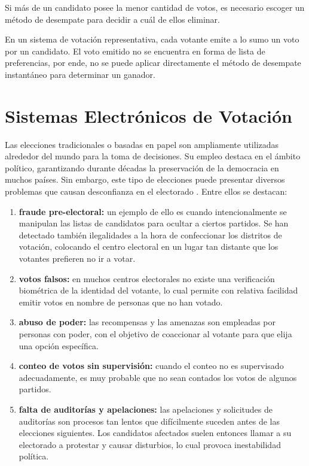 Si m\'as de un candidato posee la menor cantidad de votos, es necesario escoger un m\'etodo de desempate para decidir a cu\'al de ellos eliminar.


En un sistema de votaci\'on representativa, cada votante emite a lo sumo un voto por un candidato. El voto emitido no se encuentra en forma de lista de preferencias, por ende, no se puede aplicar directamente el m\'etodo de desempate instant\'aneo para determinar un ganador. %

\section{Sistemas Electr\'onicos de Votaci\'on}

Las elecciones tradicionales o basadas en papel son ampliamente
utilizadas alrededor del mundo para la toma de decisiones. Su empleo
destaca en el ámbito político, garantizando durante décadas la
preservación de la democracia en muchos países. Sin embargo, este tipo
de elecciones puede presentar diversos problemas que causan desconfianza
en el electorado \citep{trustworthy_blockchain}. Entre ellos se destacan: 

\begin{enumerate}
\item
  \textbf{fraude pre-electoral:} un ejemplo de ello es cuando
  intencionalmente se manipulan las listas de candidatos para ocultar a
  ciertos partidos. Se han detectado también ilegalidades a la hora de
  confeccionar los distritos de votación, colocando el centro electoral
  en un lugar tan distante que los votantes prefieren no ir a votar. \label{item:fraud}
\item
  \textbf{votos falsos:} en muchos centros electorales no existe una
  verificación biométrica de la identidad del votante, lo cual permite
  con relativa facilidad emitir votos en nombre de personas que no han
  votado.
\item
  \textbf{abuso de poder:} las recompensas y las amenazas son empleadas
  por personas con poder, con el objetivo de coaccionar al votante para
  que elija una opción específica.
\item
  \textbf{conteo de votos sin supervisión:} cuando el conteo no es
  supervisado adecuadamente, es muy probable que no sean contados los
  votos de algunos partidos. \label{item:unsupervised-counting}
\item
  \textbf{falta de auditorías y apelaciones:} las apelaciones y
  solicitudes de auditorías son procesos tan lentos que difícilmente
  suceden antes de las elecciones siguientes. Los candidatos afectados
  suelen entonces llamar a su electorado a protestar y causar
  disturbios, lo cual provoca inestabilidad política.
\end{enumerate}

